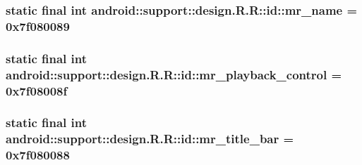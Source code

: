 \hypertarget{classandroid_1_1support_1_1design_1_1_r_1_1id_968d09b9a04aac815bfd4d3f5c75ef39}{
\subsubsection[{mr\_\-name}]{\setlength{\rightskip}{0pt plus 5cm}static final int android::support::design.R.R::id::mr\_\-name = 0x7f080089}}
\label{classandroid_1_1support_1_1design_1_1_r_1_1id_968d09b9a04aac815bfd4d3f5c75ef39}


\hypertarget{classandroid_1_1support_1_1design_1_1_r_1_1id_1d3c2881da49fbb4119136c80c843dac}{
\subsubsection[{mr\_\-playback\_\-control}]{\setlength{\rightskip}{0pt plus 5cm}static final int android::support::design.R.R::id::mr\_\-playback\_\-control = 0x7f08008f}}
\label{classandroid_1_1support_1_1design_1_1_r_1_1id_1d3c2881da49fbb4119136c80c843dac}


\hypertarget{classandroid_1_1support_1_1design_1_1_r_1_1id_5560638a41ec9c52ecb391c3e01cc572}{
\subsubsection[{mr\_\-title\_\-bar}]{\setlength{\rightskip}{0pt plus 5cm}static final int android::support::design.R.R::id::mr\_\-title\_\-bar = 0x7f080088}}
\label{classandroid_1_1support_1_1design_1_1_r_1_1id_5560638a41ec9c52ecb391c3e01cc572}


